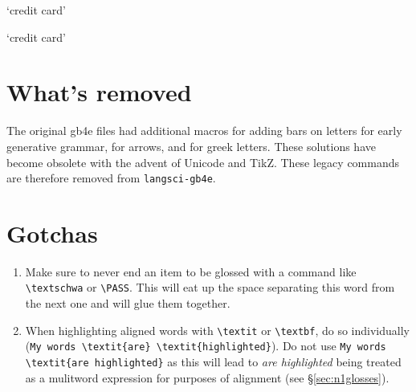 \documentclass[output=guidelines]{langscibook}
\newcommand{\cmd}[1]{\texttt{\textbackslash#1}}
\begin{document}
\begin{exe} 
\glt `credit card'

\glt `credit card'
\end{exe} 




\section{What's removed}
The original gb4e files had additional macros for adding bars on letters for early generative grammar, for arrows, and for greek letters. These solutions have become obsolete with the advent of Unicode and TikZ. These legacy commands are therefore removed from \texttt{langsci-gb4e}.

\section{Gotchas}
\begin{enumerate}
\item Make sure to never end an item to be glossed with a command like \cmd{textschwa} or \cmd{PASS}. This will eat up the space separating this word from the next one and will glue them together. 
\item When highlighting aligned words with \cmd{textit} or \cmd{textbf}, do so individually (\verb+My words \textit{are} \textit{highlighted}+). Do not use \verb+My words+ \verb+\textit{are highlighted}+ as this will lead to \textit{are highlighted} being treated as a mulitword expression for purposes of alignment (see §\ref{sec:n1glosses}).
\end{enumerate}
 
\end{document}
